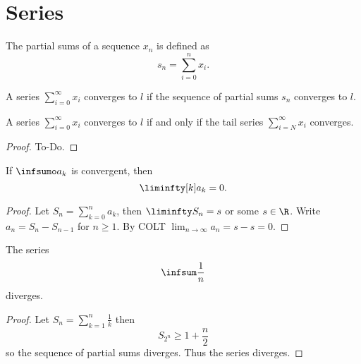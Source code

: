 \chapter{Series}\label{cha:series}

\begin{definition}\label{def:partial_sums}
   \leanok
  The partial sums of a sequence $x_n$ is defined as
  \[
  s_n = \sum_{i = 0}^{n} x_i.
  \]
\end{definition}

\begin{definition}\label{def:convergent_series}
   \leanok
  A series $\sum_{i = 0}^{\infty} x_i$ converges to $l$ if the sequence of partial sums $s_n$ converges to $l$.
\end{definition}

\begin{lemma}\label{lem:sum_tail_conv}
     \leanok
    A series $\sum_{i = 0}^{\infty} x_i$ converges to $l$ if and only if the tail series $\sum_{i = N}^{\infty} x_i$ converges.
\end{lemma}
\begin{proof}
    To-Do.
\end{proof}

\begin{lemma}\label{lem:sumifconv_seqconvtozero}
    If $\infsumo a_k$ is convergent,
    then
    \[
    \liminfty[k] a_k = 0.
    \]
\end{lemma}
\begin{proof}
    Let $S_n = \sum_{k = 0}^{n}a_k$,
    then $\liminfty S_n = s$ or some $s \in \R$.
    Write $a_n = S_n - S_{n - 1}$ for $n \geq 1$.
    By COLT
    $\lim_{n \to \infty}a_n = s - s = 0$.
\end{proof}

\begin{lemma}\label{lem:harmsumdiv}
    The series
    \[
    \infsum\frac{1}{n}
    \]
    diverges.
\end{lemma}
\begin{proof}
    Let $S_n = \sum_{k = 1}^{n}\frac{1}{k}$ then
    \[
    S_{2 ^ n} \geq 1 + \frac{n}{2}
    \]
    so the sequence of partial sums diverges.
    Thus the series diverges.
\end{proof}

